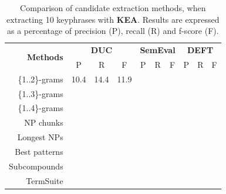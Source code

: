     \begin{table}[h]
      \centering
      \begin{tabular}{rccccccccc}
        \toprule
        \multirow{2}{*}[-2pt]{\textbf{Methods}} & \multicolumn{3}{c}{\textbf{DUC}} & \multicolumn{3}{c}{\textbf{SemEval}} & \multicolumn{3}{c}{\textbf{DEFT}}\\
        \cmidrule(r){2-4}\cmidrule(lr){5-7}\cmidrule(l){8-10}
        & P & R & F & P & R & F & P & R & F\\
        \midrule
        \{1..2\}-grams & 10.4 & 14.4 & 11.9 & & & & & &\\
        \{1..3\}-grams & & & & & & & & &\\
        \{1..4\}-grams & & & & & & & & &\\
        NP chunks & & & & & & & & &\\
        Longest NPs & & & & & & & & &\\
        Best patterns & & & & & & & & &\\
        Subcompounds & & & & & & & & &\\
        TermSuite & & & & & & & & &\\
        \bottomrule
      \end{tabular}
      \caption{Comparison of candidate extraction methods, when extracting 10
               keyphrases with \textbf{KEA}. Results are expressed as a
               percentage of precision (P), recall (R) and f-score (F).
               \label{tab:keyphrase_extraction_results}}
    \end{table}

